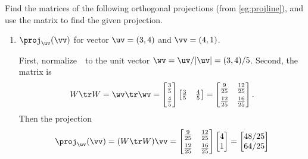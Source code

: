\begin{example} \label{eg:projlinem}
Find the matrices of the following orthogonal projections (from \autoref{eg:projline}), and use the matrix to find the given projection.
\begin{enumerate}
\item \(\proj_\uv(\vv)\) for vector \(\uv=(3,4)\) and \(\vv=(4,1)\).
\begin{solution} 
First, normalize~\uv\ to the unit vector \(\wv=\uv/|\uv|=(3,4)/5\). Second, the matrix is
\begin{equation*}
W\tr W=\wv\tr\wv=\begin{bmatrix} \frac35\\[1ex] \frac45 \end{bmatrix}\begin{bmatrix} \frac35&\frac45 \end{bmatrix}
=\begin{bmatrix} \frac9{25}&\frac{12}{25}\\[1ex]
\frac{12}{25}&\frac{16}{25} \end{bmatrix}.
\end{equation*}
Then the projection
\begin{equation*}
\proj_\uv(\vv) =(W\tr W)\vv
=\begin{bmatrix} \frac9{25}&\frac{12}{25}\\[1ex]
\frac{12}{25}&\frac{16}{25} \end{bmatrix}\begin{bmatrix} 4\\1 \end{bmatrix}
=\begin{bmatrix} 48/25\\64/25 \end{bmatrix}
\end{equation*}
\end{solution}


\end{enumerate}
\end{example}
